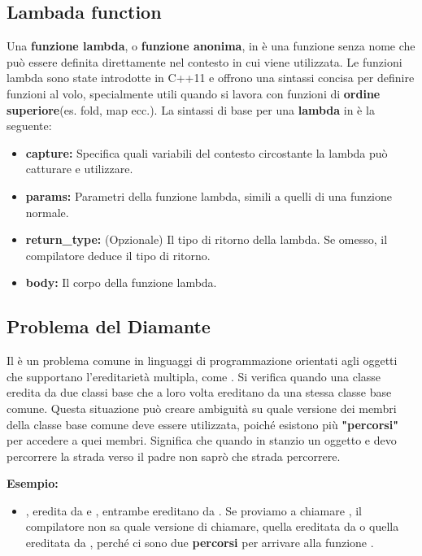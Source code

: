 \subsection{Lambada function}
Una \textbf{funzione lambda}, o \textbf{funzione anonima}, in  è una funzione senza nome che può essere definita direttamente nel contesto in cui viene utilizzata. Le funzioni lambda sono state introdotte in C++11 e offrono una sintassi concisa per definire funzioni al volo, specialmente utili quando si lavora con funzioni di \textbf{ordine superiore}(es. fold, map ecc.).\newline\newline
La sintassi di base per una \textbf{lambda} in  è la seguente:\newline\newline
{}
\begin{itemize}
    \item \textbf{capture:} Specifica quali variabili del contesto circostante la lambda può catturare e utilizzare.
    \item \textbf{params:} Parametri della funzione lambda, simili a quelli di una funzione normale.
    \item \textbf{return\_type:} (Opzionale) Il tipo di ritorno della lambda. Se omesso, il compilatore deduce il tipo di ritorno.
    \item \textbf{body:} Il corpo della funzione lambda.
\end{itemize}

\newpage
\subsection{Problema del Diamante}
Il \textcolor{blue}{} è un problema comune in linguaggi di programmazione orientati agli oggetti che supportano l'ereditarietà multipla, come . Si verifica quando una classe eredita da due classi base che a loro volta ereditano da una stessa classe base comune. Questa situazione può creare ambiguità su quale versione dei membri della classe base comune deve essere utilizzata, poiché esistono più \textbf{"percorsi"} per accedere a quei membri.\newline
Significa che quando in stanzio un oggetto e devo percorrere la strada verso il padre non saprò che strada percorrere.
\begin{tcolorbox}[width=14cm, boxsep=10pt]
    \textbf{Esempio:}
    
    \begin{itemize}
        \item \textcolor{blue}{},  eredita da  e , entrambe ereditano da . Se proviamo a chiamare , il compilatore non sa quale versione di  chiamare, quella ereditata da  o quella ereditata da , perché ci sono due \textbf{percorsi} per arrivare alla funzione .
    \end{itemize}
\end{tcolorbox}
